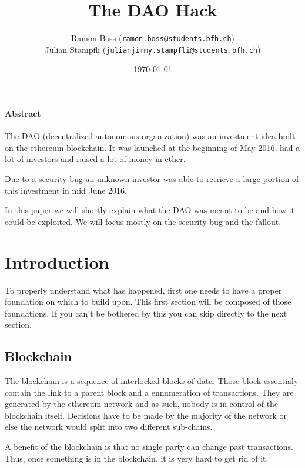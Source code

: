 \documentclass[a4paper, 11pt]{scrartcl}
\begin{document}
\title{The DAO Hack}
\date{\today}   %
\author{
  Ramon Boss (\texttt{ramon.boss@students.bfh.ch}) \\
  Julian Stampfli (\texttt{julianjimmy.stampfli@students.bfh.ch}) 
}
 
\maketitle

\paragraph{Abstract}
The DAO (decentralized autonomous organization) was an investment idea built on the ethereum blockchain. It was launched at the beginning of May 2016, had a lot of investors and raised a lot of money in ether. 

Due to a security bug an unknown investor was able to retrieve a large portion of this investment in mid June 2016. 

In this paper we will shortly explain what the DAO was meant to be and how it could be exploited. We will focus mostly on the security bug and the fallout.

\setcounter{tocdepth}{2}
\tableofcontents
\clearpage

\section{Introduction}

To properly understand what has happened, first one needs to have a proper foundation on which to build upon. This first section will be composed of those foundations. If you can't be bothered by this you can skip directly to the next section. 

\subsection{Blockchain}

The blockchain is a sequence of interlocked blocks of data. Those block essentialy contain the link to a parent block and a ennumeration of transactions. They are generated by the ethereum network and as such, nobody is in control of the blockchain itself. Decisions have to be made by the majority of the network or else the network would split into two different sub-chains. \cite{blockchainKai}

A benefit of the blockchain is that no single party can change past transactions. Thus, once something is in the blockchain, it is very hard to get rid of it. \cite{blockchainKai}
\end{document}
